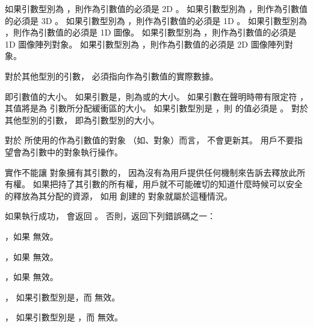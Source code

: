 如果引數型別為 ，則作為引數值的必須是 2D 。
如果引數型別為 ，則作為引數值的必須是 3D 。
如果引數型別為 ，則作為引數值的必須是 1D 。
如果引數型別為 ，則作為引數值的必須是 1D 圖像。
如果引數型別為 ，則作為引數值的必須是 1D 圖像陣列對象。
如果引數型別為 ，則作為引數值的必須是 2D 圖像陣列對象。

對於其他型別的引數，  必須指向作為引數值的實際數據。

 即引數值的大小。
如果引數是，則為或的大小。
如果引數在聲明時帶有限定符 ，其值將是為  引數所分配緩衝區的大小。
如果引數型別是 ，則  的值必須是 。
對於其他型別的引數，  即為引數型別的大小。

\startnotepar
對於  所使用的作為引數值的對象
（如、對象）而言，
不會更新其。
用戶不要指望會為引數中的對象執行操作。

實作不能讓  對象擁有其引數的，
因為沒有為用戶提供任何機制來告訴去釋放此所有權。
如果把持了其引數的所有權，用戶就不可能確切的知道什麼時候可以安全的釋放為其分配的資源，
如用  創建的  對象就屬於這種情況。
\stopnotepar

如果執行成功，  會返回 。
否則，返回下列錯誤碼之一：
\startigBase
\item {}，如果  無效。

\item {}，如果  無效。

\item {}，如果  無效。

\item {}，
如果引數型別是，而  無效。

\item {}，
如果引數型別是 ，而  無效。

